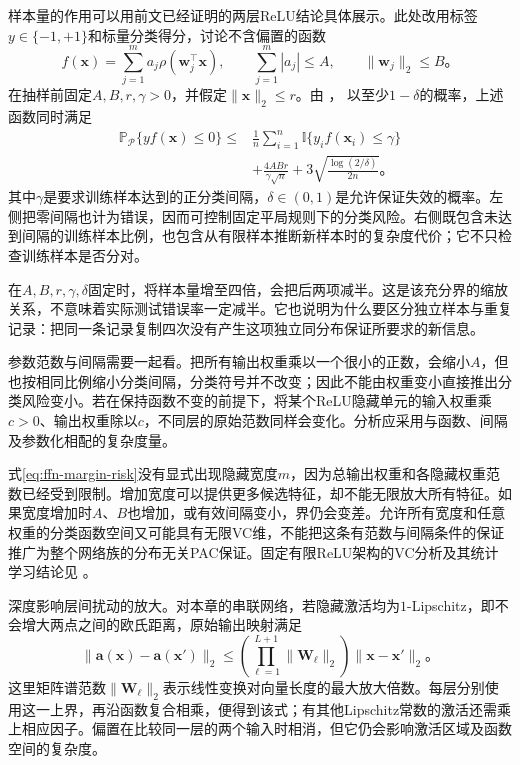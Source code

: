 样本量的作用可以用前文已经证明的两层ReLU结论具体展示。此处改用标签$y\in\{-1,+1\}$和标量分类得分，讨论不含偏置的函数
\[
  f(\bm{x})=\sum_{j=1}^{m}a_j\rho(\bm{w}_j^{\top}\bm{x}),
  \qquad \sum_{j=1}^{m}|a_j|\leq A,
  \qquad \lVert\bm{w}_j\rVert_2\leq B\text{。}
\]
在抽样前固定$A,B,r,\gamma>0$，并假定$\lVert\bm{x}\rVert_2\leq r$。由
，
以至少$1-\delta$的概率，上述函数同时满足
\begin{equation}
  \begin{aligned}
    \mathbb{P}_{\mathcal{P}}\{yf(\bm{x})\leq0\}
    \leq{}&\frac1n\sum_{i=1}^{n}
      \mathbb{I}\{y_i f(\bm{x}_i)\leq\gamma\}\\
    &+\frac{4ABr}{\gamma\sqrt n}
      +3\sqrt{\frac{\log(2/\delta)}{2n}}\text{。}
  \end{aligned}
  \label{eq:ffn-margin-risk}
\end{equation}
其中$\gamma$是要求训练样本达到的正分类间隔，$\delta\in(0,1)$是允许保证失效的概率。左侧把零间隔也计为错误，因而可控制固定平局规则下的分类风险。右侧既包含未达到间隔的训练样本比例，也包含从有限样本推断新样本时的复杂度代价；它不只检查训练样本是否分对。

在$A,B,r,\gamma,\delta$固定时，将样本量增至四倍，会把后两项减半。这是该充分界的缩放关系，不意味着实际测试错误率一定减半。它也说明为什么要区分独立样本与重复记录：把同一条记录复制四次没有产生这项独立同分布保证所要求的新信息。

参数范数与间隔需要一起看。把所有输出权重乘以一个很小的正数，会缩小$A$，但也按相同比例缩小分类间隔，分类符号并不改变；因此不能由权重变小直接推出分类风险变小。若在保持函数不变的前提下，将某个ReLU隐藏单元的输入权重乘$c>0$、输出权重除以$c$，不同层的原始范数同样会变化。分析应采用与函数、间隔及参数化相配的复杂度量。

式\eqref{eq:ffn-margin-risk}没有显式出现隐藏宽度$m$，因为总输出权重和各隐藏权重范数已经受到限制。增加宽度可以提供更多候选特征，却不能无限放大所有特征。如果宽度增加时$A$、$B$也增加，或有效间隔变小，界仍会变差。允许所有宽度和任意权重的分类函数空间又可能具有无限VC维，不能把这条有范数与间隔条件的保证推广为整个网络族的分布无关PAC保证。固定有限ReLU架构的VC分析及其统计学习结论见
。

深度影响层间扰动的放大。对本章的串联网络，若隐藏激活均为$1$-Lipschitz，即不会增大两点之间的欧氏距离，原始输出映射满足
\begin{equation}
  \lVert\bm{a}(\bm{x})-\bm{a}(\bm{x}')\rVert_2
  \leq
  \left(\prod_{\ell=1}^{L+1}\lVert\bm{W}_\ell\rVert_2\right)
  \lVert\bm{x}-\bm{x}'\rVert_2\text{。}
  \label{eq:ffn-input-sensitivity}
\end{equation}
这里矩阵谱范数$\lVert\bm{W}_\ell\rVert_2$表示线性变换对向量长度的最大放大倍数。每层分别使用这一上界，再沿函数复合相乘，便得到该式；有其他Lipschitz常数的激活还需乘上相应因子。偏置在比较同一层的两个输入时相消，但它仍会影响激活区域及函数空间的复杂度。

